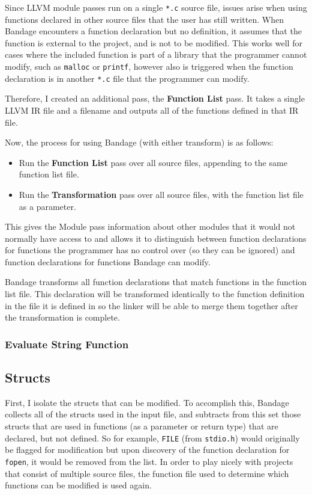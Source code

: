 Since LLVM module passes run on a single \verb!*.c! source file, issues arise when using functions declared in other source files that the user has still written.
When Bandage encounters a function declaration but no definition, it assumes that the function is external to the project, and is not to be modified.
This works well for cases where the included function is part of a library that the programmer cannot modify, such as \verb!malloc! or \verb!printf!, however also is triggered when the function declaration is in another \verb!*.c! file that the programmer can modify.

Therefore, I created an additional pass, the \textbf{Function List} pass.
It takes a single LLVM IR file and a filename and outputs all of the functions defined in that IR file.

Now, the process for using Bandage (with either transform) is as follows:
\begin{itemize}
\item Run the \textbf{Function List} pass over all source files, appending to the same function list file.
\item Run the \textbf{Transformation} pass over all source files, with the function list file as a parameter.
\end{itemize}

This gives the Module pass information about other modules that it would not normally have access to and allows it to distinguish between function declarations for functions the programmer has no control over (so they can be ignored) and function declarations for functions Bandage can modify.

Bandage transforms all function declarations that match functions in the function list file.
This declaration will be transformed identically to the function definition in the file it is defined in so the linker will be able to merge them together after the transformation is complete.

\subsubsection{Evaluate String Function}

\subsection{Structs}

First, I isolate the structs that can be modified.
To accomplish this, Bandage collects all of the structs used in the input file, and subtracts from this set those structs that are used in functions (as a parameter or return type) that are declared, but not defined.
So for example, \verb!FILE! (from \verb!stdio.h!) would originally be flagged for modification but upon discovery of the function declaration for \verb!fopen!, it would be removed from the list.
In order to play nicely with projects that consist of multiple source files, the function file used to determine which functions can be modified is used again.

